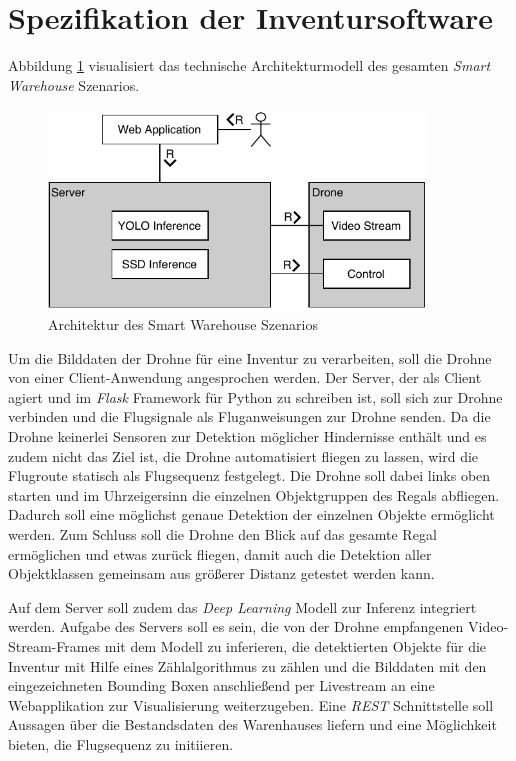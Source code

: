\section{Spezifikation der Inventursoftware} \label{software}

Abbildung \ref{tam} visualisiert das technische Architekturmodell des gesamten \textit{Smart Warehouse} Szenarios.

\begin{figure}[H]
	\begin{center}
		\includegraphics[width=10cm]{Bilder/tam.pdf}
		\caption[Architektur des Smart Warehouse Szenarios]{Architektur des Smart Warehouse Szenarios}
		\label{tam}
	\end{center}
\end{figure}

Um die Bilddaten der Drohne für eine Inventur zu verarbeiten, soll die Drohne von einer Client-Anwendung angesprochen werden. Der Server, der als Client agiert und im \textit{Flask} Framework für Python zu schreiben ist, soll sich zur Drohne verbinden und die Flugsignale als Fluganweisungen zur Drohne senden. Da die Drohne keinerlei Sensoren zur Detektion möglicher Hindernisse enthält und es zudem nicht das Ziel ist, die Drohne automatisiert fliegen zu lassen, wird die Flugroute statisch als Flugsequenz festgelegt. Die Drohne soll dabei links oben starten und im Uhrzeigersinn die einzelnen Objektgruppen des Regals abfliegen. Dadurch soll eine möglichst genaue Detektion der einzelnen Objekte ermöglicht werden. Zum Schluss soll die Drohne den Blick auf das gesamte Regal ermöglichen und etwas zurück fliegen, damit auch die Detektion aller Objektklassen gemeinsam aus größerer Distanz getestet werden kann.

Auf dem Server soll zudem das \textit{Deep Learning} Modell zur Inferenz integriert werden. Aufgabe des Servers soll es sein, die von der Drohne empfangenen Video-Stream-Frames mit dem Modell zu inferieren, die detektierten Objekte für die Inventur mit Hilfe eines Zählalgorithmus zu zählen und die Bilddaten mit den eingezeichneten Bounding Boxen anschließend per Livestream an eine Webapplikation zur Visualisierung weiterzugeben. Eine \textit{REST} Schnittstelle soll Aussagen über die Bestandsdaten des Warenhauses liefern und eine Möglichkeit bieten, die Flugsequenz zu initiieren.


